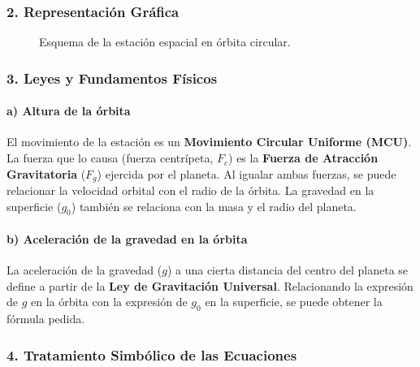 \subsubsection*{2. Representación Gráfica}
\begin{figure}[H]
    \centering
    \caption{Esquema de la estación espacial en órbita circular.}
\end{figure}

\subsubsection*{3. Leyes y Fundamentos Físicos}
\paragraph*{a) Altura de la órbita}
El movimiento de la estación es un \textbf{Movimiento Circular Uniforme (MCU)}. La fuerza que lo causa (fuerza centrípeta, $F_c$) es la \textbf{Fuerza de Atracción Gravitatoria} ($F_g$) ejercida por el planeta. Al igualar ambas fuerzas, se puede relacionar la velocidad orbital con el radio de la órbita. La gravedad en la superficie ($g_0$) también se relaciona con la masa y el radio del planeta.

\paragraph*{b) Aceleración de la gravedad en la órbita}
La aceleración de la gravedad ($g$) a una cierta distancia del centro del planeta se define a partir de la \textbf{Ley de Gravitación Universal}. Relacionando la expresión de $g$ en la órbita con la expresión de $g_0$ en la superficie, se puede obtener la fórmula pedida.

\subsubsection*{4. Tratamiento Simbólico de las Ecuaciones}
